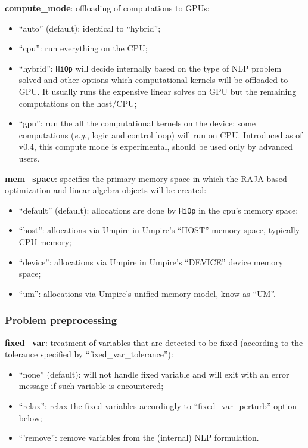 \documentclass[11pt]{article}
\newcounter{line}
\newcommand{\Hi}{\texttt{HiOp}\xspace}
\begin{document}
\medskip

\noindent \textbf{compute\_mode}: offloading of computations to GPUs:
\begin{itemize}
\item ``auto'' (default): identical to ``hybrid'';
\item ``cpu'': run everything on the CPU;
\item ``hybrid'':  \Hi will decide internally based on the type of NLP problem solved and other options which computational kernels will be offloaded to GPU. It usually runs the expensive linear solves on GPU but the remaining computations on the host/CPU;
\item ``gpu'': run the all the computational kernels on the device; some computations (\textit{e.g.}, logic and control loop) will run on CPU. Introduced as of v0.4, this compute mode is experimental, should be used only by advanced users.
\end{itemize}

\medskip


\noindent \textbf{mem\_space}: specifies the primary memory space in which the RAJA-based optimization and linear algebra objects will be created:
\begin{itemize}
\item ``default'' (default): allocations are done by \Hi in the cpu's memory space;
\item ``host'':  allocations via Umpire in Umpire's ``HOST'' memory space, typically CPU memory;
\item ``device'': allocations via Umpire in Umpire's ``DEVICE'' device memory space;
\item ``um'': allocations via Umpire's unified memory model, know as ``UM''.
\end{itemize}

\medskip

\subsubsection{Problem preprocessing}


\noindent \textbf{fixed\_var}: treatment of  variables that are detected to be fixed (according to the tolerance specified by ``fixed\_var\_tolerance''):
\begin{itemize}
\item ``none'' (default): will not handle fixed variable and will exit with an error message if such variable is encountered;
\item ``relax'':  relax the fixed variables accordingly to ``fixed\_var\_perturb'' option below;
\item ``'remove'': remove variables from the (internal) NLP formulation.
\end{itemize}
\end{document}
